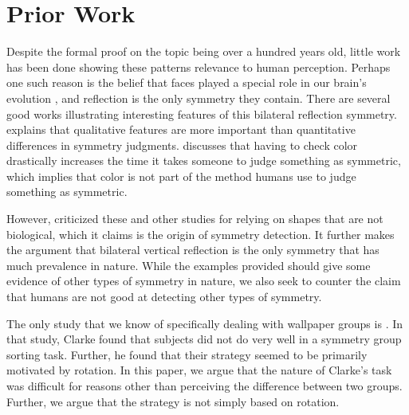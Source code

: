 \section{Prior Work}
Despite the formal proof on the topic being over a hundred years old, little work has been done showing these patterns relevance to human perception. Perhaps one such reason is the belief that faces played a special role in our brain's evolution \citep{ffa}, and reflection is the only symmetry they contain. There are several good works illustrating interesting features of this bilateral reflection symmetry. \citet{bilateral-qual} explains that qualitative features are more important than quantitative differences in symmetry judgments. \citet{bilateral-color} discusses that having to check color drastically increases the time it takes someone to judge something as symmetric, which implies that color is not part of the method humans use to judge something as symmetric.

However, \citet{bio} criticized these and other studies for relying on shapes that are not biological, which it claims is the origin of symmetry detection. It further makes the argument that bilateral vertical reflection is the only symmetry that has much prevalence in nature. While the examples provided should give some evidence of other types of symmetry in nature, we also seek to counter the claim that humans are not good at detecting other types of symmetry. 

The only study that we know of specifically dealing with wallpaper groups is \citet{clarke}. In that study, Clarke found that subjects did not do very well in a symmetry group sorting task. Further, he found that their strategy seemed to be primarily motivated by rotation. In this paper, we argue that the nature of Clarke's task was difficult for reasons other than perceiving the difference between two groups. Further, we argue that the strategy is not simply based on rotation.
